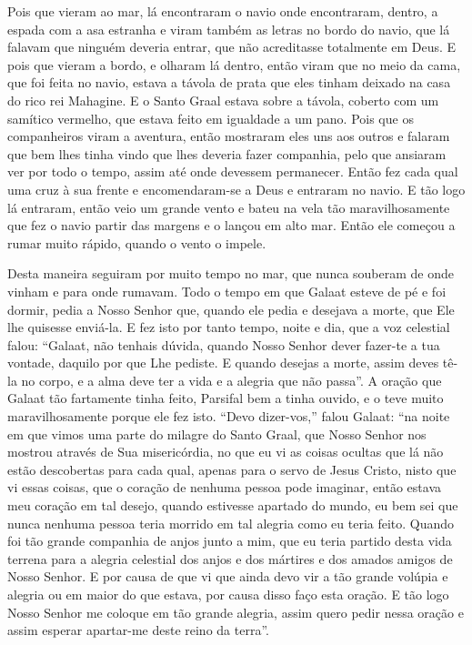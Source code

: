 Pois que vieram ao mar, lá encontraram o navio onde encontraram, dentro, a
espada com a asa estranha e viram também as letras no bordo do navio, que lá
falavam que ninguém deveria entrar, que não acreditasse totalmente em Deus. E
pois que vieram a bordo, e olharam lá dentro, então viram que no meio da cama,
que foi feita no navio, estava a távola de prata que eles tinham deixado na
casa do rico rei Mahagine. E o Santo Graal estava sobre a távola, coberto com
um samítico vermelho, que estava feito em igualdade a um pano. Pois que os
companheiros viram a aventura, então mostraram eles uns aos outros e falaram que
bem lhes tinha vindo que lhes deveria fazer companhia, pelo que ansiaram ver
por todo o tempo, assim até onde devessem permanecer. Então fez cada
qual uma cruz à sua frente e encomendaram-se a Deus e entraram no navio. E tão
logo lá entraram, então veio um grande vento e bateu na vela tão
maravilhosamente que fez o navio partir das margens e o lançou em alto mar.
Então ele começou a rumar muito rápido, quando o vento o impele. 

Desta maneira seguiram por muito tempo no mar, que nunca souberam de onde vinham
e para onde rumavam. Todo o tempo em que Galaat esteve de pé e foi dormir,
pedia a Nosso Senhor que, quando ele pedia e desejava a morte, que Ele lhe
quisesse enviá-la. E fez isto por tanto tempo, noite e dia, que a voz celestial
falou: “Galaat, não tenhais dúvida, quando Nosso Senhor dever fazer-te a tua
vontade, daquilo por que Lhe pediste. E quando desejas a morte, assim deves
tê-la no corpo, e a alma deve ter a vida e a alegria que não passa”. A
oração que Galaat tão fartamente tinha feito, Parsifal bem a tinha ouvido, e o
teve muito maravilhosamente porque ele fez isto. “Devo dizer-vos,” falou
Galaat: “na noite em que vimos uma parte do milagre do Santo Graal, que Nosso
Senhor nos mostrou através de Sua misericórdia, no que eu vi as coisas ocultas
que lá não estão descobertas para cada qual, apenas para o servo de Jesus
Cristo, nisto que vi essas coisas, que o coração de nenhuma pessoa pode
imaginar, então estava meu coração em tal desejo, quando estivesse apartado do
mundo, eu bem sei que nunca nenhuma pessoa teria morrido em tal alegria como eu
teria feito. Quando foi tão grande companhia de anjos junto a mim, que eu teria
partido desta vida terrena para a alegria celestial dos anjos e dos mártires e
dos amados amigos de Nosso Senhor. E por causa de que vi que ainda devo vir a
tão grande volúpia e alegria ou em maior do que estava, por causa disso faço
esta oração. E tão logo Nosso Senhor me coloque em tão grande alegria, assim
quero pedir nessa oração e assim esperar apartar-me deste reino da terra”. 

